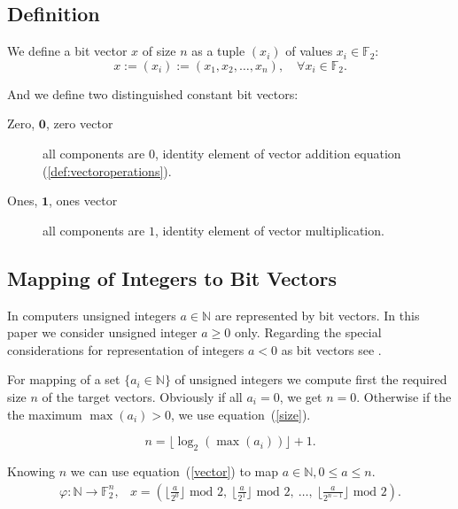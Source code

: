\documentclass[a4paper]{article}
\newcommand{\BF}{\mathbb{F}}
\newcommand{\BN}{\mathbb{N}}
\newcommand{\0}{\mathbf{0}}
\newcommand{\1}{\mathbf{1}}
\begin{document}
\subsection{Definition}
We define a bit vector $x$ of size $n$ as a tuple $(x_i)$ of values $x_i \in \BF_2$:
\begin{equation}
x := (x_i) := (x_1, x_2, \dots, x_n), \quad \forall x_i \in \BF_2.
\end{equation}

And we define two distinguished constant bit vectors:
\begin{description}
\item[Zero, $\0$, zero vector] all components are $0$, identity element of vector addition equation (\ref{def:vectoroperations}).
\item[Ones, $\1$, ones vector] all components are $1$, identity element of vector multiplication.
\end{description}

\subsection{Mapping of Integers to Bit Vectors}

In computers unsigned integers $a \in \BN$ are represented by bit vectors. In this paper we
consider unsigned integer $a \ge 0$ only. 
Regarding the special considerations for representation of integers $a < 0$
as bit vectors see \cite{knuth:taocp_v4_f1}.

For mapping of a set $\{a_i \in \BN\}$ of unsigned integers we compute first the
required size $n$ of the target vectors. Obviously if all $a_i = 0$, we get $n = 0$.
Otherwise if the the maximum $\max(a_i) > 0$, we use equation~(\ref{size}).

\begin{equation}
n = \lfloor \log_{2}(\max(a_i)) \rfloor + 1.
\label{size}
\end{equation}

Knowing $n$ we can use equation~(\ref{vector}) to map $a \in \BN, 0 \le a \le n$.
\begin{equation}
\begin{array}{rr}
\varphi : \BN \rightarrow \BF_2^n, & x = \left (
\lfloor \frac{a}{2^0} \rfloor \text{ mod } 2, \
\lfloor \frac{a}{2^1} \rfloor \text{ mod } 2, \ 
\dots, \ 
\lfloor \frac{a}{2^{n-1}} \rfloor \text{ mod } 2
\right) .
\end{array}
\label{vector}
\end{equation}
\end{document}
